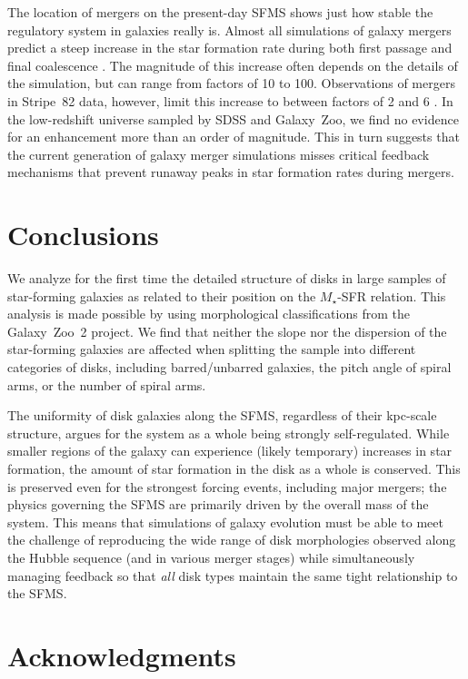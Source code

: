 \documentclass[useAMS,usenatbib]{mn2e}
\begin{document}
The location of mergers on the present-day SFMS shows just how stable the regulatory system in galaxies really is. Almost all simulations of galaxy mergers predict a steep increase in the star formation rate during both first passage and final coalescence \citep[e.g.,][]{hop08}. The magnitude of this increase often depends on the details of the simulation, but can range from factors of 10 to 100. Observations of mergers in Stripe~82 data, however, limit this increase to between factors of 2 and 6 \citep{kav14}. In the low-redshift universe sampled by SDSS and Galaxy~Zoo, we find no evidence for an enhancement more than an order of magnitude. This in turn suggests that the current generation of galaxy merger simulations misses critical feedback mechanisms that prevent runaway peaks in star formation rates during mergers.

\section{Conclusions}

We analyze for the first time the detailed structure of disks in large samples of star-forming galaxies as related to their position on the $M_\star$-SFR relation. This analysis is made possible by using morphological classifications from the Galaxy~Zoo~2 project. We find that neither the slope nor the dispersion of the star-forming galaxies are affected when splitting the sample into different categories of disks, including barred/unbarred galaxies, the pitch angle of spiral arms, or the number of spiral arms. 

The uniformity of disk galaxies along the SFMS, regardless of their kpc-scale structure, argues for the system as a whole being strongly self-regulated. While smaller regions of the galaxy can experience (likely temporary) increases in star formation, the amount of star formation in the disk as a whole is conserved. This is preserved even for the strongest forcing events, including major mergers; the physics governing the SFMS are primarily driven by the overall mass of the system. This means that simulations of galaxy evolution must be able to meet the challenge of reproducing the wide range of disk morphologies observed along the Hubble sequence (and in various merger stages) while simultaneously managing feedback so that \emph{all} disk types maintain the same tight relationship to the SFMS.


\section*{Acknowledgments}
\end{document}
